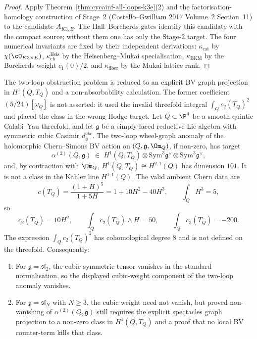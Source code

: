 \begin{proof}
Apply Theorem~\ref{thm:cycainf-all-loops-k3e}(2) and the
factorisation-homology construction of Stage~2 (Costello--Gwilliam
2017 Volume~2 Section~11) to the candidate $A_{K3,E}$. The
Hall--Borcherds gates identify this candidate with the compact source;
without them one has only the Stage-$2$ target. The four numerical
invariants are fixed by their independent derivations:
$\kappa_{\mathrm{cat}}$ by
$\chi(\cO_{K3\times E})$, $\kappa_{\mathrm{ch}}^{\mathrm{Heis}}$ by the
Heisenberg--Mukai specialisation, $\kappa_{\mathrm{BKM}}$ by the
Borcherds weight $c_1(0)/2$, and $\kappa_{\mathrm{fiber}}$ by the Mukai
lattice rank.
\end{proof}

\begin{theorem}
\label{thm:cycainf-quintic-two-loop-obstruction}
The two-loop obstruction problem is reduced to an explicit BV graph
projection in $H^1(Q,T_Q)$ and a non-absorbability calculation. The
former coefficient $(5/24)[\omega_Q]$ is not asserted: it used the
invalid threefold integral $\int_Q c_2(T_Q)^2$ and placed the class in
the wrong Hodge target.
Let $Q \subset \P^4$ be a smooth quintic Calabi--Yau threefold, and
let $\mathfrak g$ be a simply-laced reductive Lie algebra with
symmetric cubic Casimir $d^{abc}_{\mathfrak g}$. The two-loop
wheel-graph anomaly of the holomorphic Chern--Simons BV action on
$(Q, \mathfrak g, \Om_Q)$, if non-zero, has target
\[
 \alpha^{(2)}(Q, \mathfrak g)
 \;\in\;
 H^1(Q,T_Q) \otimes \mathrm{Sym}^3 \mathfrak g^\vee \otimes
 \mathrm{Sym}^3 \mathfrak g^\vee,
\]
and, by contraction with $\Om_Q$, $H^1(Q,T_Q) \cong H^{2,1}(Q)$ has
dimension $101$. It is not a class in the K\"ahler line
$H^{1,1}(Q)$. The valid ambient Chern data are
\[
 c(T_Q)=\frac{(1+H)^5}{1+5H}
 = 1 + 10H^2 - 40H^3,\qquad
 \int_Q H^3=5,
\]
so
\[
 c_2(T_Q)=10H^2,\qquad
 \int_Q c_2(T_Q)\wedge H=50,\qquad
 \int_Q c_3(T_Q)=-200.
\]
The expression $\int_Q c_2(T_Q)^2$ has cohomological degree $8$ and
is not defined on the threefold. Consequently:
\begin{enumerate}[label=\textup{(\arabic*)}]
\item For $\mathfrak g = \mathfrak{sl}_2$, the cubic symmetric tensor
vanishes in the standard normalisation, so the displayed cubic-weight
component of the two-loop anomaly vanishes.
\item For $\mathfrak g = \mathfrak{sl}_N$ with $N \geq 3$, the
cubic weight need not vanish, but proved non-vanishing of
$\alpha^{(2)}(Q,\mathfrak g)$ still requires the explicit spectacles
graph projection to a non-zero class in $H^1(Q,T_Q)$ and a proof that
no local BV counter-term kills that class.
\end{enumerate}
\end{theorem}

